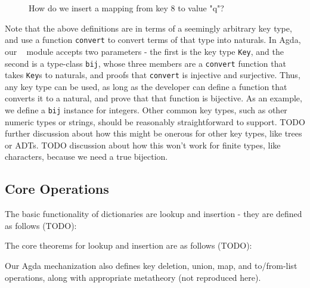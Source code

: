 \begin{figure}[H]
  \centering
  \caption{How do we insert a mapping from key $8$ to value "q"?}
  \label{fig:find-6}
\end{figure}

Note that the above definitions are in terms of a seemingly arbitrary key type,
and use a function \texttt{convert} to convert terms of that type into naturals.
In Agda, our \dd~ module accepts two parameters - the first is the key type \texttt{Key},
and the second is a type-class \texttt{bij}, whose three members are a \texttt{convert}
function that takes \texttt{Key}s to naturals, and proofs that \texttt{convert} is
injective and surjective. Thus, any key type can be used, as long as the developer
can define a function that converts it to a natural, and prove that that function is
bijective. As an example, we define a \texttt{bij} instance for integers. Other common
key types, such as other numeric types or strings, should be reasonably straightforward
to support. TODO further discussion about how this might be onerous for other key types,
like trees or ADTs. TODO discussion about how this won't work for finite types, like
characters, because we need a true bijection.

\subsection{Core Operations}
\label{sec:DD:basics}
The basic functionality of dictionaries are lookup and insertion - they are defined as follows
(TODO):

The core theorems for lookup and insertion are as follows (TODO):

Our Agda mechanization also defines key deletion, union, map, and to/from-list operations, along
with appropriate metatheory (not reproduced here).

